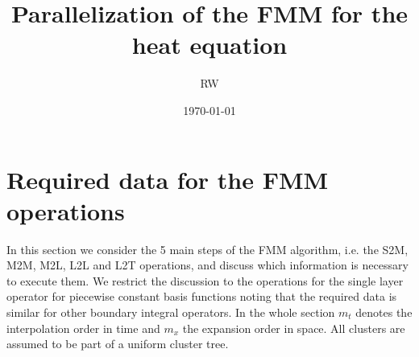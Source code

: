 \documentclass[a4paper,11pt]{article}
\title{\sffamily\bfseries Parallelization of the FMM for the heat equation}
\author{RW}
\date{\today}
\theoremstyle{plain}
\theoremstyle{definition}
\theoremstyle{remark}
\begin{document}
\maketitle

\section{Required data for the FMM operations}
In this section we consider the 5 main steps of the FMM algorithm, i.e. the S2M, M2M, M2L, L2L and L2T operations, and
discuss which information is necessary to execute them. We restrict the discussion to the operations for the single
layer operator for piecewise constant basis functions noting that the required data is similar for other boundary 
integral operators. In the whole section $m_t$ denotes the interpolation order in time and $m_x$ the expansion order in 
space. All clusters are assumed to be part of a uniform cluster tree.
\end{document}
